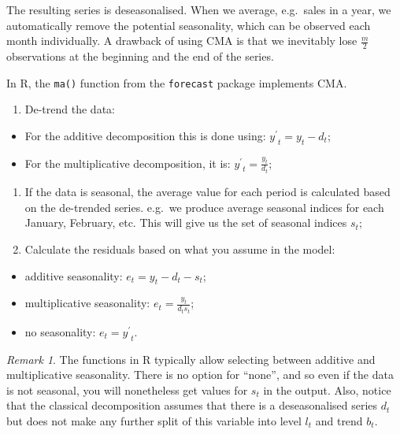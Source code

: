 \documentclass[]{book}
\providecommand{\tightlist}{%
  \setlength{\itemsep}{0pt}\setlength{\parskip}{0pt}}
\theoremstyle{definition}
\theoremstyle{definition}
\theoremstyle{definition}
\theoremstyle{definition}
\theoremstyle{remark}
\newtheorem*{remark}{Remark}
\begin{document}
The resulting series is deseasonalised. When we average, e.g.~sales in a year, we automatically remove the potential seasonality, which can be observed each month individually. A drawback of using CMA is that we inevitably lose \(\frac{m}{2}\) observations at the beginning and the end of the series.

In R, the \texttt{ma()} function from the \texttt{forecast} package implements CMA.

\begin{enumerate}
\def\labelenumi{\arabic{enumi}.}
\setcounter{enumi}{2}
\tightlist
\item
  De-trend the data:
\end{enumerate}

\begin{itemize}
\tightlist
\item
  For the additive decomposition this is done using: \({y^\prime}_t = y_t -d_t\);
\item
  For the multiplicative decomposition, it is: \({y^\prime}_t = \frac{y_t}{d_t}\);
\end{itemize}

\begin{enumerate}
\def\labelenumi{\arabic{enumi}.}
\setcounter{enumi}{3}
\tightlist
\item
  If the data is seasonal, the average value for each period is calculated based on the de-trended series. e.g.~we produce average seasonal indices for each January, February, etc. This will give us the set of seasonal indices \(s_t\);
\item
  Calculate the residuals based on what you assume in the model:
\end{enumerate}

\begin{itemize}
\tightlist
\item
  additive seasonality: \(e_t = y_t -d_t -s_t\);
\item
  multiplicative seasonality: \(e_t = \frac{y_t}{d_t s_t}\);
\item
  no seasonality: \(e_t = {y^\prime}_t\).
\end{itemize}

\begin{remark}
The functions in R typically allow selecting between additive and multiplicative seasonality. There is no option for ``none'', and so even if the data is not seasonal, you will nonetheless get values for \(s_t\) in the output. Also, notice that the classical decomposition assumes that there is a deseasonalised series \(d_t\) but does not make any further split of this variable into level \(l_t\) and trend \(b_t\).
\end{remark}
\end{document}
